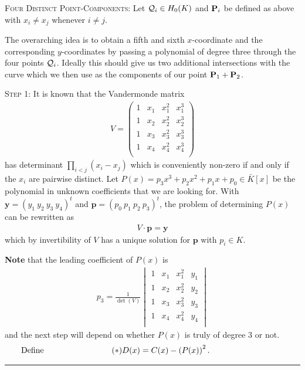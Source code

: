 \documentclass[english,11pt,a4paper]{article}
\begin{document}
\begin{case} {\scshape Four Distinct Point-Components:}
  Let $\q_i \in \enk$ and $\P_i$ be defined as above with $x_i \neq x_j$ whenever $i \neq j$.

  The overarching idea is to obtain a fifth and sixth $x$-coordinate and the corresponding $y$-coordinates by passing a polynomial of degree three through the four points $\q_i$. Ideally this should give us two additional intersections with the curve which we then use as the components of our point $\P_1 + \P_2$.

  {\scshape Step 1:} It is known that the Vandermonde matrix
  \begin{align*}V=
    \begin{pmatrix}
      1 & x_1 & x_1^2 & x_1^3\\
      1 & x_2 & x_2^2 & x_2^3\\
      1 & x_3 & x_3^2 & x_3^3\\
      1 & x_4 & x_4^2 & x_4^3\\
    \end{pmatrix}
  \end{align*}
  has determinant $\prod_{i < j} (x_i-x_j)$ which is conveniently non-zero if and only if the $x_i$ are pairwise distinct. Let $P(x) = p_3 x^3 + p_2 x^2 + p_1 x + p_0 \in \bar K[x]$ be the polynomial in unknown coefficients that we are looking for. With $\textbf{y} = (y_1 \ y_2 \ y_3 \ y_4)^t$ and $\textbf{p} = (p_0 \ p_1 \ p_2 \ p_3)^t$, the problem of determining $P(x)$ can be rewritten as
  \begin{align*}
    V \cdot \mathbf{p} = \mathbf{y}
  \end{align*}
  which by invertibility of $V$ has a unique solution for $\mathbf{p}$ with $p_i\in K$.

  \textbf{Note} that the leading coefficient of $P(x)$ is
  \begin{align*}
    p_3 = \frac{1}{\det (V)}
    \begin{vmatrix}
      1 & x_1 & x_1^2 & y_1\\
      1 & x_2 & x_2^2 & y_2\\
      1 & x_3 & x_3^2 & y_3\\
      1 & x_4 & x_4^2 & y_4\\   
    \end{vmatrix}
  \end{align*}
  and the next step will depend on whether $P(x)$ is truly of degree 3 or not.\vspace{-1mm}
\fline
\vspace{-2.5mm}
  \begin{align*}\tag{$\ast$} \label{sex}
    \rlap{\hspace{-44.5mm} Define}
    D(x) = C(x)-\left ( P(x) \right )^2.
  \end{align*}\vspace{-5mm}
  \hrule


\end{case}
\end{document}
